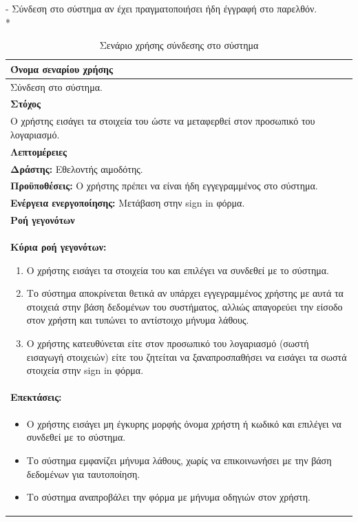 - Σύνδεση στο σύστημα αν έχει πραγματοποιήσει ήδη έγγραφή στο παρελθόν.
\\*
\begin{table}[H]	
	\begin{center}
	    \begin{tabular}{|p{\dimexpr \linewidth-2\tabcolsep}|}
	    \hline
	    \rowcolor{grayy}
	    \textbf{Όνομα σεναρίου χρήσης}
	    \\ \hline    
	    Σύνδεση στο σύστημα.
	     \\ \hline
	    \rowcolor{grayy}
	    \textbf{\textbf{Στόχος}}
	    \\ \hline
		Ο χρήστης εισάγει τα στοιχεία του ώστε να μεταφερθεί στον προσωπικό του λογαριασμό.
	    \\ \hline
	    \rowcolor{grayy}
	    \textbf{Λεπτομέρειες}
	    \\ \hline
		\textbf{Δράστης:} Εθελοντής αιμοδότης.
		\\*
		\textbf{Προϋποθέσεις:} Ο χρήστης πρέπει να είναι ήδη εγγεγραμμένος στο σύστημα.
		\\*
		\textbf{Ενέργεια ενεργοποίησης:} Μετάβαση στην sign in φόρμα.
		\\ \hline
		\rowcolor{grayy}    
	    \textbf{Ροή γεγονότων}
	    \\* 
		\textbf{Κύρια ροή γεγονότων:}
		\begin{enumerate}
			\item	Ο χρήστης εισάγει τα στοιχεία του και επιλέγει να συνδεθεί με το σύστημα.
			\item Το σύστημα αποκρίνεται θετικά αν υπάρχει εγγεγραμμένος  χρήστης με αυτά τα στοιχειά στην βάση δεδομένων του συστήματος, αλλιώς απαγορεύει
		την είσοδο στον χρήστη και τυπώνει το αντίστοιχο μήνυμα λάθους.
			\item	Ο χρήστης κατευθύνεται είτε στον προσωπικό του λογαριασμό (σωστή εισαγωγή στοιχειών) είτε του ζητείται να ξαναπροσπαθήσει να εισάγει τα σωστά στοιχεία στην sign in φόρμα.
		\end{enumerate}
		\\ \hline
		\textbf{Επεκτάσεις:}
		\\ \hline
		\begin{itemize}
		\item Ο χρήστης εισάγει μη έγκυρης  μορφής όνομα χρήστη ή κωδικό και επιλέγει να συνδεθεί με το σύστημα.
		\item Το σύστημα εμφανίζει μήνυμα λάθους, χωρίς να επικοινωνήσει με την βάση δεδομένων για ταυτοποίηση.
		\item Το σύστημα αναπροβάλει την φόρμα με μήνυμα οδηγιών στον χρήστη.
		\end{itemize}
	    \end{tabular}
	    \caption{Σενάριο χρήσης σύνδεσης στο σύστημα}
	    \label{tab:user_sign_in} 	
	\end{center}
\end{table}

